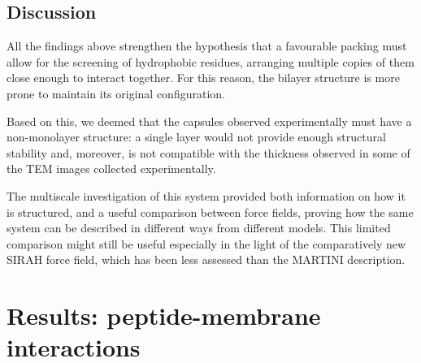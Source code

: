 \subsection{Discussion}
All the findings above strengthen the hypothesis that a favourable packing must allow for the screening of hydrophobic residues, arranging multiple copies of them close enough to interact together. For this reason, the bilayer structure is more prone to maintain its original configuration.

Based on this, we deemed that the capsules observed experimentally must have a non-monolayer structure: a single layer would not provide enough structural stability and, moreover, is not compatible with the thickness observed in some of the TEM images collected experimentally.

The multiscale investigation of this system provided both information on how it is structured, and a useful comparison between force fields, proving how the same system can be described in different ways from different models. This limited comparison might still be useful especially in the light of the comparatively new SIRAH force field, which has been less assessed than the MARTINI description.


%
%



\section{Results: peptide-membrane interactions}

